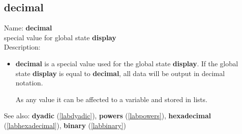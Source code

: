 \subsection{decimal}
\label{labdecimal}
\noindent Name: \textbf{decimal}\\
special value for global state \textbf{display}\\

\noindent Description: \begin{itemize}

\item \textbf{decimal} is a special value used for the global state \textbf{display}.
   If the global state \textbf{display} is equal to \textbf{decimal}, all data will
   be output in decimal notation.
    
   As any value it can be affected to a variable and stored in lists.
\end{itemize}
See also: \textbf{dyadic} (\ref{labdyadic}), \textbf{powers} (\ref{labpowers}), \textbf{hexadecimal} (\ref{labhexadecimal}), \textbf{binary} (\ref{labbinary})
